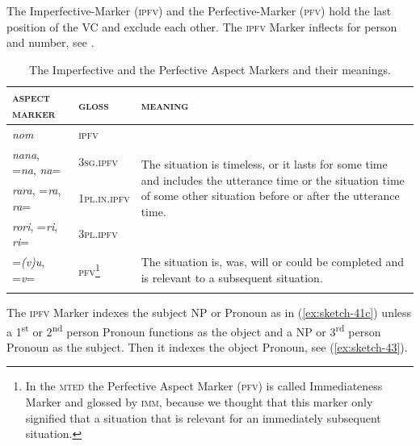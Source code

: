 \documentclass[output=paper]{langscibook}
\begin{document}
The Imperfective-Marker (\textsc{ipfv}) and the Perfective-Marker (\textsc{pfv}) hold the last position of the VC and exclude each other. The \textsc{ipfv} Marker inflects for person and number, see .


\begin{table}
    \caption{The Imperfective and the Perfective Aspect Markers and their meanings.} \label{tab:ipfvpfv}
\begin{tabularx}{\textwidth}{llX}
    \lsptoprule
    \textsc{aspect marker}&\textsc{gloss}&\textsc{meaning}\\
    \midrule
        \textit{nom}&\textsc{ipfv}&\multirow{4}{7cm}{The situation is timeless, or it lasts for some time and includes the utterance time or the situation time of some other situation before or after the utterance time.}\\
        \textit{nana}, =\textit{na}, \textit{na}=&3\textsc{sg}.\textsc{ipfv}&\\
        \textit{rara}, =\textit{ra}, \textit{ra}=&1\textsc{pl}.\textsc{in}.\textsc{ipfv}&\\ 
        \textit{rori}, =\textit{ri}, \textit{ri}=&3\textsc{pl}.\textsc{ipfv}&\\\midrule
        =\textit{(v)u}, =\textit{v}=&\textsc{pfv}\footnote{In the \textsc{mted} the Perfective Aspect Marker (\textsc{pfv}) is called Immediateness Marker and glossed by \textsc{imm}, because we thought that this marker only signified that a situation that is relevant for an immediately subsequent situation.}&The situation is, was, will or could be completed and is relevant to a subsequent situation.\\
    \lspbottomrule
\end{tabularx}
\end{table}


The \textsc{ipfv} Marker indexes the subject NP or Pronoun as in (\ref{ex:sketch-41c}) unless a 1\textsuperscript{st} or 2\textsuperscript{nd} person Pronoun functions as the object and a NP or 3\textsuperscript{rd} person Pronoun as the subject. Then it indexes the object Pronoun, see (\ref{ex:sketch-43}).
\end{document}
